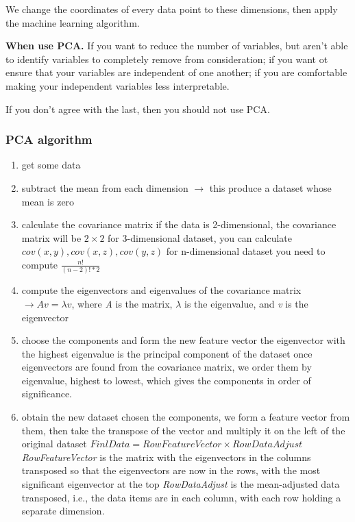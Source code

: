 \documentclass{article}
\begin{document}
We change the coordinates of every data point to these dimensions, then apply the machine learning algorithm.

\textbf{When use PCA.} If you want to reduce the number of variables, but aren't able to identify variables to completely remove from consideration; if you want ot ensure that your variables are independent of one another; if you are comfortable making your independent variables less interpretable. 

If you don't agree with the last, then you should not use PCA.


\subsubsection*{PCA algorithm}

\begin{enumerate}
	\item get some data
	\item subtract the mean from each dimension $\rightarrow$ this produce a dataset whose mean is zero
	\item calculate the covariance matrix
		\subitem if the data is 2-dimensional, the covariance matrix will be \(2 \times 2\)
		\subitem for 3-dimensional dataset, you can calculate \(cov(x, y), cov(x, z), cov(y, z)\)
		\subitem for n-dimensional dataset you need to compute \(\frac{n!}{(n-2)!*2}\)
	\item compute the eigenvectors and eigenvalues of the covariance matrix \(\rightarrow Av = \lambda v\), where \emph{A} is the matrix, $\lambda$ is the eigenvalue, and \emph{v} is the eigenvector
	\item choose the components and form the new feature vector
		\subitem the eigenvector with the highest eigenvalue is the principal component of the dataset
		\subitem once eigenvectors are found from the covariance matrix, we order them by eigenvalue, highest to lowest, which gives the components in order of significance.
	\item obtain the new dataset
		\subitem chosen the components, we form a feature vector from them, then take the transpose of the vector and multiply it on the left of the original dataset
		\subitem \(FinlData = RowFeatureVector \times RowDataAdjust\)
			\subsubitem \emph{RowFeatureVector} is the matrix with the eigenvectors in the columns transposed so that the eigenvectors are now in the rows, with the most significant eigenvector at the top
			\subsubitem \emph{RowDataAdjust} is the mean-adjusted data transposed, i.e., the data items are in each column, with each row holding a separate dimension.
\end{enumerate}
\end{document}
